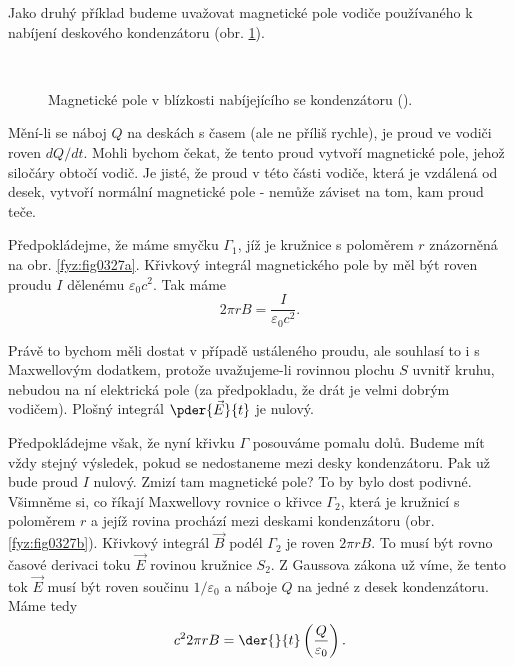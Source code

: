   Jako druhý příklad budeme uvažovat magnetické pole vodiče používaného k nabíjení deskového 
  kondenzátoru (obr. \ref{fyz:fig0327}).
  
  \begin{figure}[hb!]  %
    \centering
     \\
    \caption{Magnetické pole v blízkosti nabíjejícího se kondenzátoru 
             (\cite[s.~321]{Feynman02}).}
    \label{fyz:fig0327}
  \end{figure}
  
  Mění-li se náboj \(Q\) na deskách s časem (ale ne příliš rychle), je proud ve vodiči roven 
  \(dQ/dt\). Mohli bychom čekat, že tento proud vytvoří magnetické pole, jehož siločáry obtočí 
  vodič. Je jisté, že proud v této části vodiče, která je vzdálená od desek, vytvoří normální 
  magnetické pole - nemůže záviset na tom, kam proud teče.
  
  Předpokládejme, že máme smyčku \(\Gamma_1\), jíž je kružnice s poloměrem \(r\) znázorněná na obr. 
  \ref{fyz:fig0327a}. Křivkový integrál magnetického pole by měl být roven proudu \(I\) dělenému 
  \(\varepsilon_0c^2\). Tak máme
  \begin{equation}\label{fyz:eq445}
    2\pi r B = \frac{I}{\varepsilon_0c^2}.
  \end{equation}
  
  Právě to bychom měli dostat v případě ustáleného proudu, ale souhlasí to i s Maxwellovým 
  dodatkem, protože uvažujeme-li rovinnou plochu \(S\) uvnitř kruhu, nebudou na ní elektrická pole 
  (za předpokladu, že drát je velmi dobrým vodičem). Plošný integrál \(\pder{\vec{E}}{t}\) je 
  nulový.
  
  Předpokládejme však, že nyní křivku \(\Gamma\) posouváme pomalu dolů. Budeme mít vždy stejný 
  výsledek, pokud se nedostaneme mezi desky kondenzátoru. Pak už bude proud \(I\) nulový. Zmizí tam 
  magnetické pole? To by bylo dost podivné. Všimněme si, co říkají Maxwellovy rovnice o křivce 
  \(\Gamma_2\), která je kružnicí s poloměrem \(r\) a jejíž rovina prochází mezi deskami 
  kondenzátoru (obr. \ref{fyz:fig0327b}). Křivkový integrál \(\vec{B}\) podél \(\Gamma_2\) je roven 
  \(2\pi rB\). To musí být rovno časové derivaci toku \(\vec{E}\) rovinou kružnice \(S_2\). Z 
  Gaussova zákona už víme, že tento tok \(\vec{E}\) musí být roven součinu \(1/\varepsilon_0\) a 
  náboje \(Q\) na jedné z desek kondenzátoru. Máme tedy
  \begin{equation}\label{fyz:eq446}
    c^22\pi r B = \der{}{t}\left(\frac{Q}{\varepsilon_0}\right).
  \end{equation}
  
